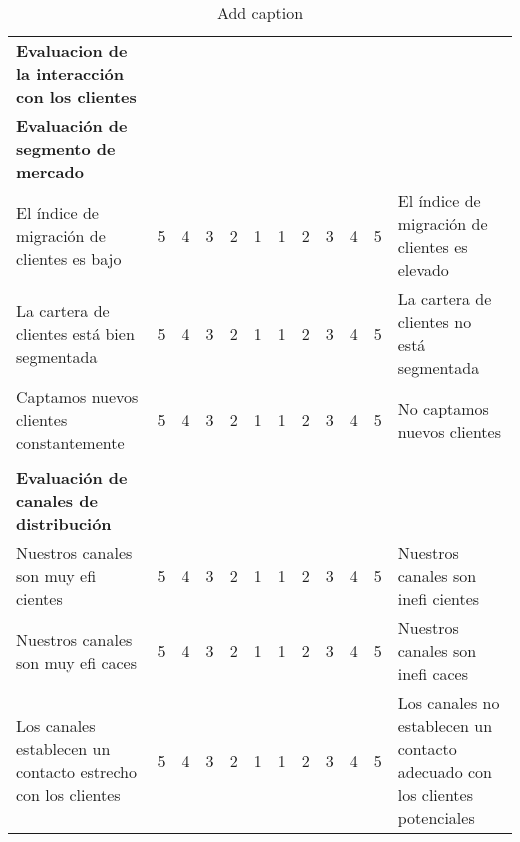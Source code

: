 \documentclass[11pt]{book}
\begin{document}
\begin{table}[htbp]
  \centering
  \caption{Add caption}
    \begin{tabular}{lccccc|cccccl}
    \multicolumn{1}{p{14.285em}}{\textcolor[rgb]{ 1,  0,  0}{\textbf{Evaluacion de la interacción con los clientes}}} &       &       &       &       & \multicolumn{1}{c}{} &       &       &       &       &       &  \\
    \multicolumn{1}{p{14.285em}}{\textbf{Evaluación de segmento de mercado}} &       &       &       &       & \multicolumn{1}{c}{} &       &       &       &       &       &  \\
    \multicolumn{1}{p{14.285em}}{El índice de migración de clientes es bajo} & 5     & 4     & 3     & 2     & 1     & 1     & 2     & 3     & 4     & 5     & \multicolumn{1}{p{12em}}{El índice de migración de clientes es elevado} \\
    \multicolumn{1}{p{14.285em}}{La cartera de clientes está bien segmentada} & 5     & 4     & 3     & 2     & 1     & 1     & 2     & 3     & 4     & 5     & \multicolumn{1}{p{12em}}{La cartera de clientes no está segmentada} \\
    \multicolumn{1}{p{14.285em}}{Captamos nuevos clientes constantemente} & 5     & 4     & 3     & 2     & 1     & 1     & 2     & 3     & 4     & 5     & \multicolumn{1}{p{12em}}{No captamos nuevos clientes} \\
          &       &       &       &       & \multicolumn{1}{c}{} &       &       &       &       &       &  \\
    \multicolumn{1}{p{14.285em}}{\textbf{Evaluación de canales de distribución}} &       &       &       &       & \multicolumn{1}{c}{} &       &       &       &       &       &  \\
    \multicolumn{1}{p{14.285em}}{Nuestros canales son muy efi cientes} & 5     & 4     & 3     & 2     & 1     & 1     & 2     & 3     & 4     & 5     & \multicolumn{1}{p{12em}}{Nuestros canales son inefi cientes} \\
    \multicolumn{1}{p{14.285em}}{Nuestros canales son muy efi caces} & 5     & 4     & 3     & 2     & 1     & 1     & 2     & 3     & 4     & 5     & \multicolumn{1}{p{12em}}{Nuestros canales son inefi caces} \\
    \multicolumn{1}{p{14.285em}}{Los canales establecen un contacto estrecho con los clientes} & 5     & 4     & 3     & 2     & 1     & 1     & 2     & 3     & 4     & 5     & \multicolumn{1}{p{12em}}{Los canales no establecen un contacto adecuado con los clientes potenciales} \\

\end{tabular}
\end{table}
\end{document}
